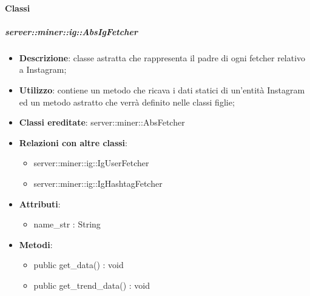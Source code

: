 	\paragraph{Classi} %
	\subparagraph{server::miner::ig::AbsIgFetcher} %
		\label{subp:server_miner_ig_AbsIgFetcher}
			\begin{itemize}
				\item \textbf{Descrizione}: classe astratta che rappresenta il padre di ogni fetcher relativo a Instagram;
				\item \textbf{Utilizzo}: contiene un metodo che ricava i dati statici di un'entità Instagram ed un metodo astratto che verrà definito nelle classi figlie;
				\item \textbf{Classi ereditate}: server::miner::AbsFetcher
				\item \textbf{Relazioni con altre classi}:
					\begin{itemize}
						\item server::miner::ig::IgUserFetcher
						\item server::miner::ig::IgHashtagFetcher
					\end{itemize}
				\item \textbf{Attributi}:    
					\begin{itemize}
						\item name\_str : String
					\end{itemize}
				\item \textbf{Metodi}:  
					\begin{itemize}
						\item public get\_data() : void
						\item public get\_trend\_data() : void
					\end{itemize}
			\end{itemize}

